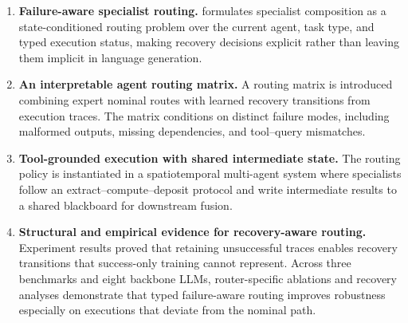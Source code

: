 \begin{enumerate}[leftmargin=*,itemsep=1pt]
    \item \textbf{Failure-aware specialist routing.}
     \starname{} formulates specialist composition as a state-conditioned routing problem over the current agent, task type, and typed execution status, making recovery decisions explicit rather than leaving them implicit in language generation.

    \item \textbf{An interpretable agent routing matrix.}
    A routing matrix is introduced combining expert nominal routes with learned recovery transitions from execution traces.
    The matrix conditions on distinct failure modes, including malformed outputs, missing dependencies, and tool--query mismatches.

    \item \textbf{Tool-grounded execution with shared intermediate state.}
    The routing policy is instantiated in a spatiotemporal multi-agent system where specialists follow an extract--compute--deposit protocol and write intermediate results to a shared blackboard for downstream fusion.

    \item \textbf{Structural and empirical evidence for recovery-aware routing.}
    Experiment results proved that retaining unsuccessful traces enables recovery transitions that success-only training cannot represent.
    Across three benchmarks and eight backbone LLMs, router-specific ablations and recovery analyses demonstrate that typed failure-aware routing improves robustness especially on executions that deviate from the nominal path.
\end{enumerate}
